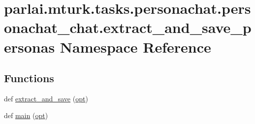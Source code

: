 \hypertarget{namespaceparlai_1_1mturk_1_1tasks_1_1personachat_1_1personachat__chat_1_1extract__and__save__personas}{}\section{parlai.\+mturk.\+tasks.\+personachat.\+personachat\+\_\+chat.\+extract\+\_\+and\+\_\+save\+\_\+personas Namespace Reference}
\label{namespaceparlai_1_1mturk_1_1tasks_1_1personachat_1_1personachat__chat_1_1extract__and__save__personas}
\subsection*{Functions}
\begin{DoxyCompactItemize}
\item 
def \hyperlink{namespaceparlai_1_1mturk_1_1tasks_1_1personachat_1_1personachat__chat_1_1extract__and__save__personas_ad456be8590e65dece8a4b1e57aacef65}{extract\+\_\+and\+\_\+save} (\hyperlink{namespaceparlai_1_1mturk_1_1tasks_1_1personachat_1_1personachat__chat_1_1extract__and__save__personas_a4956ea1d7db767343948d06c207e3f14}{opt})
\item 
def \hyperlink{namespaceparlai_1_1mturk_1_1tasks_1_1personachat_1_1personachat__chat_1_1extract__and__save__personas_a3fadfe6571f33f89367defbb1d3907e0}{main} (\hyperlink{namespaceparlai_1_1mturk_1_1tasks_1_1personachat_1_1personachat__chat_1_1extract__and__save__personas_a4956ea1d7db767343948d06c207e3f14}{opt})
\end{DoxyCompactItemize}

